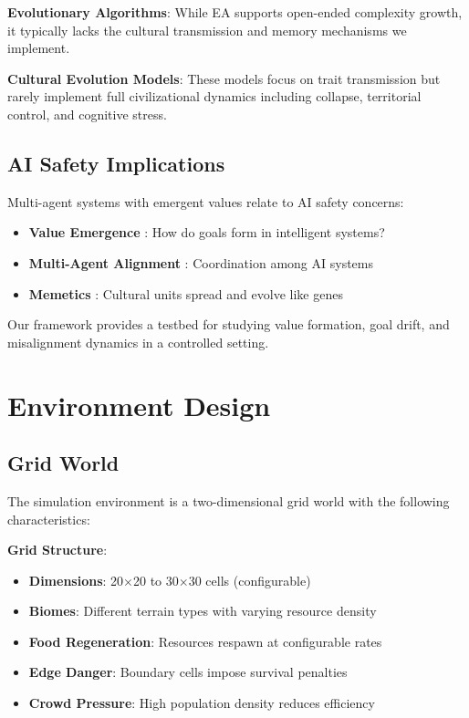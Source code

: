 \documentclass[11pt,a4paper]{article}
\begin{document}
\textbf{Evolutionary Algorithms}: While EA supports open-ended complexity growth, it typically lacks the cultural transmission and memory mechanisms we implement.

\textbf{Cultural Evolution Models}: These models focus on trait transmission but rarely implement full civilizational dynamics including collapse, territorial control, and cognitive stress.

\subsection{AI Safety Implications}

Multi-agent systems with emergent values relate to AI safety concerns:

\begin{itemize}
    \item \textbf{Value Emergence} \cite{bostrom2014}: How do goals form in intelligent systems?
    \item \textbf{Multi-Agent Alignment} \cite{dafoe2020}: Coordination among AI systems
    \item \textbf{Memetics} \cite{dawkins1976}: Cultural units spread and evolve like genes
\end{itemize}

Our framework provides a testbed for studying value formation, goal drift, and misalignment dynamics in a controlled setting.

\section{Environment Design}

\subsection{Grid World}

The simulation environment is a two-dimensional grid world with the following characteristics:

\textbf{Grid Structure}:
\begin{itemize}
    \item \textbf{Dimensions}: 20$\times$20 to 30$\times$30 cells (configurable)
    \item \textbf{Biomes}: Different terrain types with varying resource density
    \item \textbf{Food Regeneration}: Resources respawn at configurable rates
    \item \textbf{Edge Danger}: Boundary cells impose survival penalties
    \item \textbf{Crowd Pressure}: High population density reduces efficiency
\end{itemize}
\end{document}
